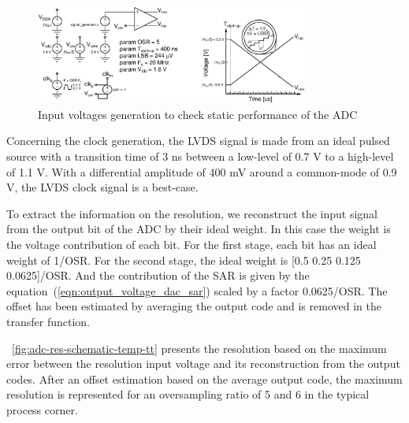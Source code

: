 \begin{figure}[htp]
    \centering
    \includegraphics[width=0.8\textwidth]{Chapter5/Figs/adc_chip/input_signal_generator.ps}
    \caption{Input voltages generation to check static performance of the ADC}
    \label{fig:tb_adc_stimuli}
\end{figure}

Concerning the clock generation, the LVDS signal is made from an ideal pulsed source with a transition time of 3 ns between a low-level of 0.7 V to a high-level of 1.1 V. With a differential amplitude of 400 mV around a common-mode of 0.9 V, the LVDS clock signal is a best-case.

To extract the information on the resolution, we reconstruct the input signal from the output bit of the ADC by their ideal weight. In this case the weight is the voltage contribution of each bit. For the first stage, each bit has an ideal weight of 1/OSR. For the second stage, the ideal weight is [0.5 0.25 0.125 0.0625]/OSR. And the contribution of the SAR is given by the equation~(\ref{eqn:output_voltage_dac_sar}) scaled by a factor 0.0625/OSR\@. The offset has been estimated by averaging the output code and is removed in the transfer function. 

\figurename~\ref{fig:adc-res-schematic-temp-tt} presents the resolution based on the maximum error between the resolution input voltage and its reconstruction from the output codes. After an offset estimation based on the average output code, the maximum resolution is represented for an oversampling ratio of 5 and 6 in the typical process corner.

